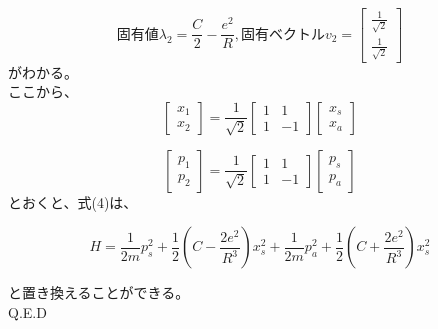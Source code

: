 \documentclass{jsarticle}
\begin{document}
	\begin{equation}
	固有値 \lambda_2 = \frac{C}{2}-\frac{e^{2}}{R},
	固有ベクトル v_2=
	\begin{bmatrix}
	\frac{1}{\sqrt{2}} \\
	\frac{1}{\sqrt{2}}
	\end{bmatrix}
	\end{equation}
	がわかる。\\
	ここから、
	\begin{equation}
	\begin{bmatrix}
	x_1 \\
	x_2
	\end{bmatrix}
	=
	\frac{1}{\sqrt{2}}
	\begin{bmatrix}
	1 & 1 \\
	1 & -1
	\end{bmatrix}
	\begin{bmatrix}
	x_s \\
	x_a
	\end{bmatrix}
	\end{equation}

	\begin{equation}
	\begin{bmatrix}
	p_1 \\
	p_2
	\end{bmatrix}
	=
	\frac{1}{\sqrt{2}}
	\begin{bmatrix}
	1 & 1 \\
	1 & -1
	\end{bmatrix}
	\begin{bmatrix}
	p_s \\
	p_a
	\end{bmatrix}
	\end{equation}
	とおくと、式(4)は、

	\begin{equation}
		H=\frac{1}{2m}p_s^2+\frac{1}{2}\left( C-\frac{2e^2}{R^3}\right) x_s^2+
		\frac{1}{2m}p_a^2+\frac{1}{2}\left( C+\frac{2e^2}{R^3}\right) x_s^2
	\end{equation}

	と置き換えることができる。\\
	Q.E.D
\end{document}
